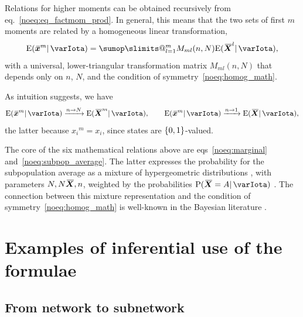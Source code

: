 \documentclass{article}
\makeatletter
\theoremstyle{remark}
\theoremstyle{innote}
\def\sum{\DOTSI\sumop\slimits@}
\newcommand*{\citep}{\parencites}
\renewcommand*{\|}{\mathpunct{|}}%
\DeclarePairedDelimiter\set{\{}{\}}
\newcommand*{\p}{\mathrm{P}}%
\newcommand*{\sect}{\S}%
\newcommand*{\chap}{ch.}%
\newcommand*{\eqn}{eq.}%
\newcommand*{\eqns}{eqs}%
\newcommand*{\cf}{{cf.}}
\newcommand*{\E}{\mathrm{E}}
\DeclarePairedDelimiter\expp{(}{)}
\newcommand*{\expe}{\E\expp}%
\theoremstyle{simple}
\newcommand*{\widebar}[1]{{\mkern1.5mu\skew{2}\overline{\mkern-1.5mu#1\mkern-1.5mu}\mkern 1.5mu}}
\newcommand*{\av}{\widebar} %
\newcommand*{\sav}{\widebar} %
\newcommand*{\yxx}{x}%
\newcommand*{\yx}{\bm{\yxx}}%
\newcommand*{\yxs}{\sav{\yx}}%
\newcommand*{\yX}{\bm{X}}%
\newcommand*{\yXf}{\av{\yX}}%
\newcommand*{\yH}{\varIota}
\makeatother
\begin{document}
Relations for higher moments can be obtained recursively from
\eqn~\eqref{noeq:eq_factmom_prod}. In general, this means that the two sets of
first $m$ moments are related by a homogeneous linear transformation,
\begin{equation}
  \label{noeq:lin_transf_moments}
  \expe{\yxs^m \| \yH} = \sum_{l=1}^m M_{ml}(n,N) \expe{\yXf^l \| \yH},
\end{equation}
with a universal, lower-triangular transformation matrix $M_{ml}(n,N)$ that
depends only on $n$, $N$, and the condition of symmetry~\eqref{noeq:homog_math}.

As intuition suggests, we have 
\begin{equation}
  \label{noeq:limit_moments}
  \expe{\yxs^m \| \yH} \xrightarrow{n\to N} 
  \expe{\yXf^m \| \yH},
\qquad
  \expe{\yxs^m \| \yH} \xrightarrow{n\to 1} 
  \expe{\yXf \| \yH},
\end{equation}
the latter because ${x_i}^m=x_i$, since states are $\set{0,1}$-valued.

\bigskip

The core of the six mathematical relations above are
\eqns~\eqref{noeq:marginal} and~\eqref{noeq:subpop_average}. The latter
expresses the probability for the subpopulation average as a mixture of
hypergeometric distributions
\cites[\chap~3]{jaynes1994_r2003}[\sect~4.8.3]{ross1976_r2010}[\sect~II.6]{feller1950_r1968},
with parameters $N,N\yXf,n$, weighted by the probabilities
$\p(\yXf = A \|\yH)$ \citep[\cf][\sect~4, esp.\ \eqn~(22)]{kendall1967}.
The connection between this mixture representation and the condition of
symmetry~\eqref{noeq:homog_math} is well-known in the Bayesian literature
\citep{kendall1967,definetti1969b,heathetal1976,diaconis1977,diaconisetal1980,jaynes1986c}.


\section{Examples of inferential use of the formulae}

\subsection{From network to subnetwork}
\label{nosec:pop2sub_examples}
\end{document}
